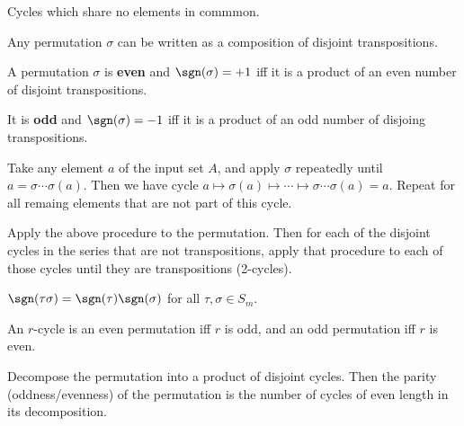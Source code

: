 \begin{definition}
  Cycles which share no elements in commmon.
\end{definition}

\begin{theorem}
  Any permutation $\sigma$ can be written as a composition of disjoint transpositions.
\end{theorem}

\begin{definition}
  A permutation $\sigma$ is \textbf{even} and $\sgn(\sigma) = +1$ iff it is a product of an even number of disjoint transpositions.

  It is \textbf{odd} and $\sgn(\sigma) = -1$ iff it is a product of an odd number of disjoing transpositions.
\end{definition}

\begin{procedure}
  Take any element $a$ of the input set $A$, and apply $\sigma$ repeatedly until $a = \sigma \cdots \sigma(a)$. Then we have cycle $a \mapsto \sigma(a) \mapsto \cdots \mapsto \sigma \cdots \sigma(a) = a$. Repeat for all remaing elements that are not part of this cycle.
\end{procedure}

\begin{procedure}
  Apply the above procedure to the permutation. Then for each of the disjoint cycles in the series that are not transpositions, apply that procedure to each of those cycles until they are transpositions (2-cycles).
\end{procedure}

\begin{lemma}
  $\sgn(\tau \sigma) = \sgn(\tau) \sgn(\sigma)$ for all $\tau, \sigma \in S_m$.
\end{lemma}

\begin{lemma}
  An $r$-cycle is an even permutation iff $r$ is odd, and an odd permutation iff $r$ is even.
\end{lemma}

\begin{procedure}
  Decompose the permutation into a product of disjoint cycles. Then the parity (oddness/evenness) of the permutation is the number of cycles of even length in its decomposition.
\end{procedure}

